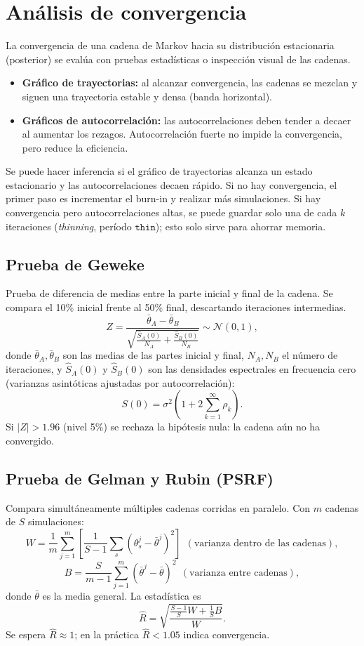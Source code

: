 \documentclass[11pt]{article}
\newcommand{\N}{\mathcal{N}}
\theoremstyle{definition}
\begin{document}
\section{Análisis de convergencia}
La convergencia de una cadena de Markov hacia su distribución estacionaria (posterior) se evalúa con pruebas estadísticas o inspección visual de las cadenas.
\begin{itemize}[leftmargin=2em]
  \item \textbf{Gráfico de trayectorias:} al alcanzar convergencia, las cadenas se mezclan y siguen una trayectoria estable y densa (banda horizontal).
  \item \textbf{Gráficos de autocorrelación:} las autocorrelaciones deben tender a decaer al aumentar los rezagos. Autocorrelación fuerte no impide la convergencia, pero reduce la eficiencia.
\end{itemize}
Se puede hacer inferencia si el gráfico de trayectorias alcanza un estado estacionario y las autocorrelaciones decaen rápido. Si no hay convergencia, el primer paso es incrementar el burn-in y realizar más simulaciones. Si hay convergencia pero autocorrelaciones altas, se puede guardar solo una de cada $k$ iteraciones (\emph{thinning}, período $\texttt{thin}$); esto solo sirve para ahorrar memoria.

\subsection{Prueba de Geweke}
Prueba de diferencia de medias entre la parte inicial y final de la cadena. Se compara el 10\% inicial frente al 50\% final, descartando iteraciones intermedias.
\[
Z=\frac{\bar\theta_A-\bar\theta_B}{\sqrt{\tfrac{\hat S_A(0)}{N_A}+\tfrac{\hat S_B(0)}{N_B}}}\sim\N(0,1),
\]
donde $\bar\theta_A,\bar\theta_B$ son las medias de las partes inicial y final, $N_A,N_B$ el número de iteraciones, y $\hat S_A(0)$ y $\hat S_B(0)$ son las densidades espectrales en frecuencia cero (varianzas asintóticas ajustadas por autocorrelación):
\[
S(0)=\sigma^2\left(1+2\sum_{k=1}^\infty\rho_k\right).
\]
Si $|Z|>1.96$ (nivel 5\%) se rechaza la hipótesis nula: la cadena aún no ha convergido.

\subsection{Prueba de Gelman y Rubin (PSRF)}
Compara simultáneamente múltiples cadenas corridas en paralelo. Con $m$ cadenas de $S$ simulaciones:
\[
W=\frac{1}{m}\sum_{j=1}^m\left[\frac{1}{S-1}\sum_{s}(\theta_s^j-\bar\theta^j)^2\right]\ \ (\text{varianza dentro de las cadenas}),
\]
\[
B=\frac{S}{m-1}\sum_{j=1}^m(\bar\theta^j-\bar\theta)^2\ \ (\text{varianza entre cadenas}),
\]
donde $\bar\theta$ es la media general. La estadística es
\[
\hat R=\sqrt{\frac{\tfrac{S-1}{S}W+\tfrac{1}{S}B}{W}}.
\]
Se espera $\hat R\approx 1$; en la práctica $\hat R<1.05$ indica convergencia.
\end{document}
